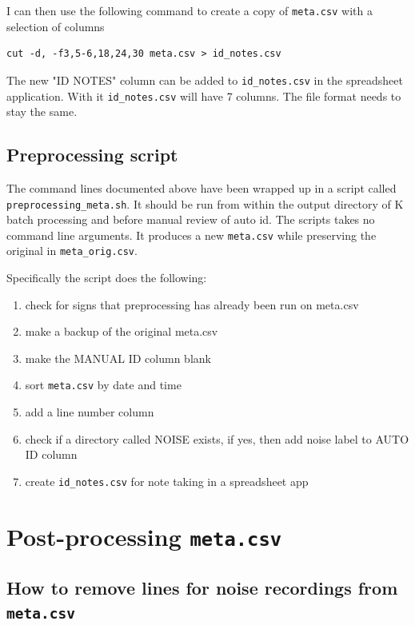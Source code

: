 \documentclass[English, 11pt, twoside, authoryear]{article}
\begin{document}
I can then use the following command to create a copy of \texttt{meta.csv} with a selection of columns
\begin{lstlisting}[numbers=none]
cut -d, -f3,5-6,18,24,30 meta.csv > id_notes.csv
\end{lstlisting}

The new "ID NOTES" column can be added to \texttt{id\_notes.csv} in the spreadsheet application. With it \texttt{id\_notes.csv} will have 7 columns. The file format needs to stay the same.

%
%
\subsection{Preprocessing script}
%
%

The command lines documented above have been wrapped up in a script called \texttt{preprocessing\_meta.sh}. It should be run from within the output directory of \textsf{K} batch processing and before manual review of auto id. The scripts takes no command line arguments.
It produces a new \texttt{meta.csv} while preserving the original in \texttt{meta\_orig.csv}.

Specifically the script does the following:
\begin{enumerate}
\item check for signs that preprocessing has already been run on meta.csv
\item make a backup of the original meta.csv
\item make the MANUAL ID column blank
\item sort \texttt{meta.csv} by date and time
\item add a line number column
\item check if a directory called NOISE exists, if yes, then add noise label to AUTO ID column
\item create \texttt{id\_notes.csv} for note taking in a spreadsheet app
\end{enumerate}


%
%
%
\section{Post-processing \texttt{meta.csv}}
%
%
%

%
%
\subsection{How to remove lines for noise recordings from \texttt{meta.csv}}
%
%
\end{document}
